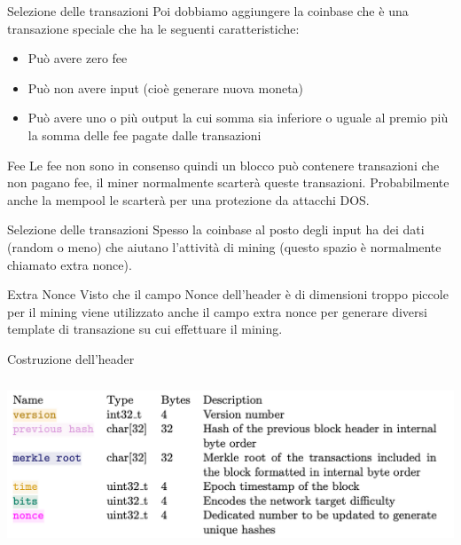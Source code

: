 \documentclass[aspectratio=169]{beamer}
\begin{document}
\begin{frame}{Selezione delle transazioni}
    Poi dobbiamo aggiungere la coinbase che è una transazione speciale che ha le seguenti caratteristiche:
    \begin{itemize}
        \item Può avere zero fee
        \item Può non avere input (cioè generare nuova moneta)
        \item Può avere uno o più output la cui somma sia inferiore o uguale al premio più la somma delle fee pagate dalle transazioni
    \end{itemize}

    \begin{alertblock}{Fee}
        Le fee non sono in consenso quindi un blocco può contenere transazioni che non pagano fee, il miner normalmente scarterà queste transazioni. Probabilmente anche la mempool le scarterà per una protezione da attacchi DOS.
    \end{alertblock}
\end{frame}

\begin{frame}{Selezione delle transazioni}
    Spesso la coinbase al posto degli input ha dei dati (random o meno) che aiutano l'attività di mining (questo spazio è normalmente chiamato extra nonce).
    
    \begin{alertblock}{Extra Nonce}
        Visto che il campo Nonce dell'header è di dimensioni troppo piccole per il mining viene utilizzato anche il campo extra nonce per generare diversi template di transazione su cui effettuare il mining.
    \end{alertblock}
\end{frame}

\begin{frame}{Costruzione dell'header}
    \begin{center}
        \includegraphics[height=5cm]{header_colorato.png}
    \end{center}
\end{frame}
\end{document}
